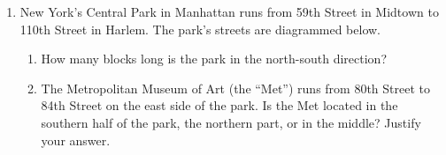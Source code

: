 \begin{enumerate}
\item New York's Central Park in Manhattan runs from 59th Street in Midtown to 110th Street in Harlem. The park's streets are diagrammed below. \par
  \begin{enumerate}[itemsep=2cm]
    \item How many blocks long is the park in the north-south direction?
    \item The Metropolitan Museum of Art (the ``Met'') runs from 80th Street to 84th Street on the east side of the park. Is the Met located in the southern half of the park, the northern part, or in the middle? Justify your answer.
  \end{enumerate}

\end{enumerate}
